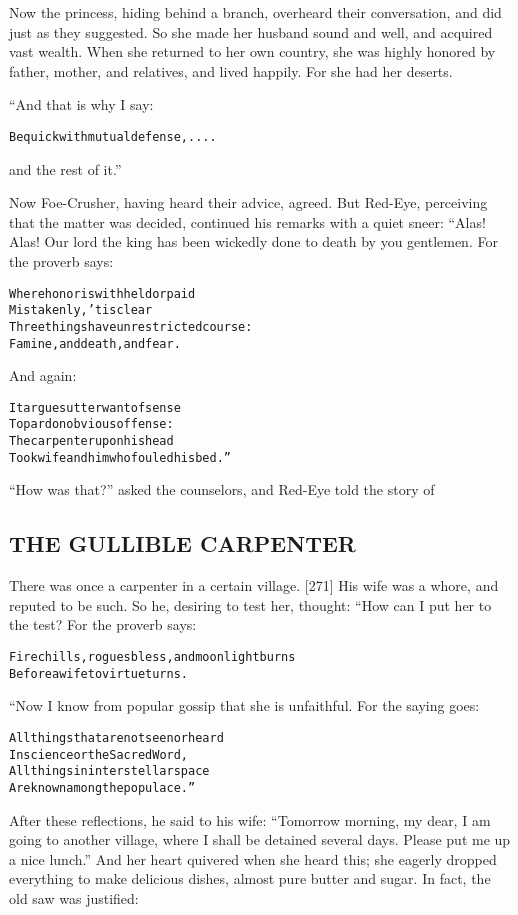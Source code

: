 \documentclass{article}
\renewenvironment{verbatim}{\begin{alltt}\normalfont\begin{centering}}{\end{centering}\end{alltt}}
\begin{document}
Now the princess, hiding behind a branch, overheard their
conversation, and did just as they suggested. So she made her
husband sound and well, and acquired vast wealth. When she returned
to her own country, she was highly honored by father, mother, and
relatives, and lived happily. For she had her deserts.

“And that is why I say:

\begin{verbatim}
Be quick with mutual defense, ....
\end{verbatim}
and the rest of it.”

Now Foe-Crusher, having heard their advice, agreed. But Red-Eye,
perceiving that the matter was decided, continued his remarks with
a quiet sneer: “Alas! Alas! Our lord the king has been wickedly
done to death by you gentlemen. For the proverb says:

\begin{verbatim}
Where honor is withheld or paid
    Mistakenly, 'tis clear
Three things have unrestricted course:
    Famine, and death, and fear.
\end{verbatim}
And again:

\begin{verbatim}
It argues utter want of sense
To pardon obvious offense:
The carpenter upon his head
Took wife and him who fouled his bed.”
\end{verbatim}
``How was that?'' asked the counselors, and Red-Eye told the story
of

\subsection{THE GULLIBLE CARPENTER}

There was once a carpenter in a certain village. [271] His wife was
a whore, and reputed to be such. So he, desiring to test her,
thought: “How can I put her to the test? For the proverb says:

\begin{verbatim}
Fire chills, rogues bless, and moonlight burns
Before a wife to virtue turns.
\end{verbatim}
“Now I know from popular gossip that she is unfaithful. For the
saying goes:

\begin{verbatim}
All things that are not seen or heard
In science or the Sacred Word,
All things in interstellar space
Are known among the populace.”
\end{verbatim}
After these reflections, he said to his wife:
``Tomorrow morning, my dear, I am going to another village, where I shall be detained several days. Please put me up a nice lunch.''
And her heart quivered when she heard this; she eagerly dropped
everything to make delicious dishes, almost pure butter and sugar.
In fact, the old saw was justified:
\end{document}
